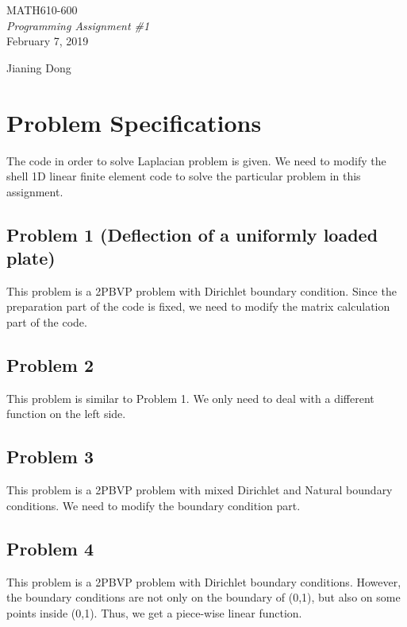 \documentclass[11pt]{article}
\begin{document}
	


\begin{titlepage}

\vspace*{55mm}
\begin{center}
{\huge MATH610-600}\\[1cm]
{\em \huge Programming Assignment \#1}\\[70mm]
{\large February 7, 2019} \\[15mm]
\end{center}

\begin{flushright}
{\LARGE Jianing Dong}
\end{flushright}

\vfill

\end{titlepage}

\newpage
\section{Problem Specifications}
The code in order to solve Laplacian problem is given. We need to modify the shell 1D linear finite element code to solve the particular problem in this assignment.
\subsection{Problem 1 (Deflection of a uniformly loaded plate)}
This problem is a 2PBVP problem with Dirichlet boundary condition. Since the preparation part of the code is fixed, we need to modify the matrix calculation part of the code.
\subsection{Problem 2 }
This problem is similar to Problem 1. We only need to deal with a different function on the left side.
\subsection{Problem 3}
This problem is a 2PBVP problem with mixed Dirichlet and Natural boundary conditions. We need to modify the boundary condition part.
\subsection{Problem 4}
This problem is a 2PBVP problem with Dirichlet boundary conditions. However, the boundary conditions are not only on the boundary of (0,1), but also on some points inside (0,1). Thus, we get a piece-wise linear function.\\
\end{document}
